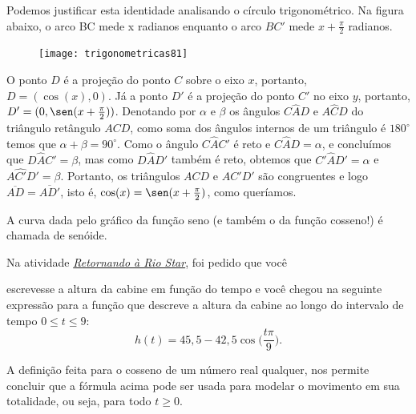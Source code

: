 Podemos justificar esta identidade analisando o círculo trigonométrico. Na figura abaixo, o arco BC mede x radianos enquanto o arco $BC'$ mede $x + \frac{\pi}{2}$ radianos. 

\begin{figure}[H]
\centering

\texttt{[image: trigonometricas81]}
\end{figure}

O ponto $D$ é a projeção do ponto $C$ sobre o eixo $x$, portanto, $D = (\cos(x), 0)$. Já a ponto $D'$ é a projeção do ponto $C'$ no eixo $y$, portanto, $D' = (0,\sen(x +  \frac{\pi}{2}))$. Denotando por $\alpha$ e $\beta$ os ângulos $C\hat{A}D$ e $A\hat{C}D$ do triângulo retângulo $ACD$, como soma dos ângulos internos de um triângulo é $180^{\circ}$ temos que $\alpha+\beta=90^{\circ}$. Como o ângulo $C\hat{A}C'$ é reto e $C\hat{A}D=\alpha$, e concluímos que $D\hat{A}C'=\beta$, mas como $D\hat{A}D'$ também é reto, obtemos que $C'\hat{A}D'=\alpha$ e $A\hat{C'}D'=\beta$. Portanto, os triângulos $ACD$ e $AC'D'$ são congruentes e logo $\overline{AD}=\overline{AD'}$, isto é, $\cos(x) = \sen(x +  \frac{\pi}{2})$, como queríamos.


A curva dada pelo gráfico da função seno (e também o da função cosseno!) é chamada de senóide. 


\begin{observation}{}
Na atividade \hyperref[trig-ativ15]{\textit{Retornando à Rio Star}}, foi pedido que você


escrevesse a altura da cabine em função do tempo e você chegou na seguinte expressão para a função que descreve a altura da cabine ao longo do intervalo de tempo $0\leq t\leq 9$:
\begin{equation*}
h(t)=45{,}5-42{,}5\cos\bigg(\frac{t\pi}{9}\bigg).
\end{equation*}

A definição feita para o cosseno de um número real qualquer, nos permite concluir que a fórmula acima pode ser usada para modelar o movimento em sua totalidade, ou seja, para todo $t\geq0$.

\end{observation}

